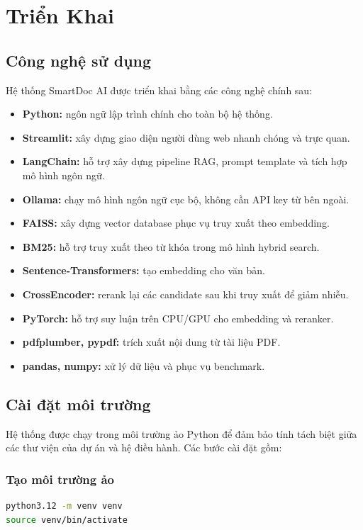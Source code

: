 \documentclass[conference]{IEEEtran}
\begin{document}
\section{Triển Khai}

\subsection{Công nghệ sử dụng}

Hệ thống SmartDoc AI được triển khai bằng các công nghệ chính sau:
\begin{itemize}
  \item \textbf{Python:} ngôn ngữ lập trình chính cho toàn bộ hệ thống.
  \item \textbf{Streamlit:} xây dựng giao diện người dùng web nhanh chóng và trực quan.
  \item \textbf{LangChain:} hỗ trợ xây dựng pipeline RAG, prompt template và tích hợp mô hình ngôn ngữ.
  \item \textbf{Ollama:} chạy mô hình ngôn ngữ cục bộ, không cần API key từ bên ngoài.
  \item \textbf{FAISS:} xây dựng vector database phục vụ truy xuất theo embedding.
  \item \textbf{BM25:} hỗ trợ truy xuất theo từ khóa trong mô hình hybrid search.
  \item \textbf{Sentence-Transformers:} tạo embedding cho văn bản.
  \item \textbf{CrossEncoder:} rerank lại các candidate sau khi truy xuất để giảm nhiễu.
  \item \textbf{PyTorch:} hỗ trợ suy luận trên CPU/GPU cho embedding và reranker.
  \item \textbf{pdfplumber, pypdf:} trích xuất nội dung từ tài liệu PDF.
  \item \textbf{pandas, numpy:} xử lý dữ liệu và phục vụ benchmark.
\end{itemize}

\subsection{Cài đặt môi trường}

Hệ thống được chạy trong môi trường ảo Python để đảm bảo tính tách biệt giữa các thư viện của dự án và hệ điều hành. Các bước cài đặt gồm:

\subsubsection{Tạo môi trường ảo}
\begin{lstlisting}[language=bash]
python3.12 -m venv venv
source venv/bin/activate
\end{lstlisting}
\end{document}
